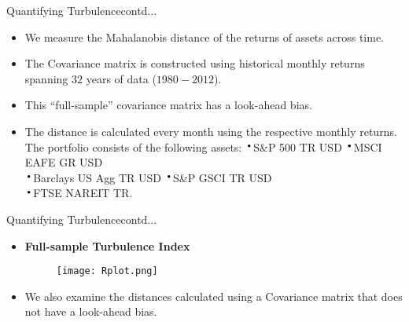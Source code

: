 \documentclass{beamer}
\newcommand*{\LargerCdot}{\raisebox{-0.25ex}{\scalebox{2.3}{$\cdot$}}}
\begin{document}
\begin{frame}{Quantifying Turbulence}{contd...}
	\begin{itemize}
		\item{We measure the Mahalanobis distance of the returns of assets 				across time.}\newline
		\item{The Covariance matrix is constructed using historical monthly returns spanning $32$ years of data ($1980 - 2012$).}\newline
		\item{This ``full-sample'' covariance matrix has a {\color{blue}look-ahead bias}.}\newline		
		\item{The distance is calculated every month using the respective monthly returns. The portfolio consists of the following assets:\newline
		$\LargerCdot$S\&P 500 TR USD \hspace*{0.59in}$\LargerCdot$MSCI EAFE GR USD\\
		$\LargerCdot$Barclays US Agg TR USD \hspace*{0.1in}$\LargerCdot$S\&P GSCI TR USD\\
		$\LargerCdot$FTSE NAREIT TR.}
	\end{itemize}
\end{frame}

\begin{frame}{Quantifying Turbulence}{contd...}
	\vspace*{-0.2 cm}
  	\begin{itemize}
		\item{\textbf{Full-sample Turbulence Index}}
		\vspace*{-0.52 cm}
		\begin{figure}
		\scalebox{0.7}
		{\hspace*{-0.23in}\texttt{[image: Rplot.png]} }
	\end{figure}
	\vspace*{-0.2 in}
		\item{We also examine the distances calculated using a 				Covariance matrix that does not have a look-ahead bias.}
	\end{itemize}
\end{frame}
\end{document}

